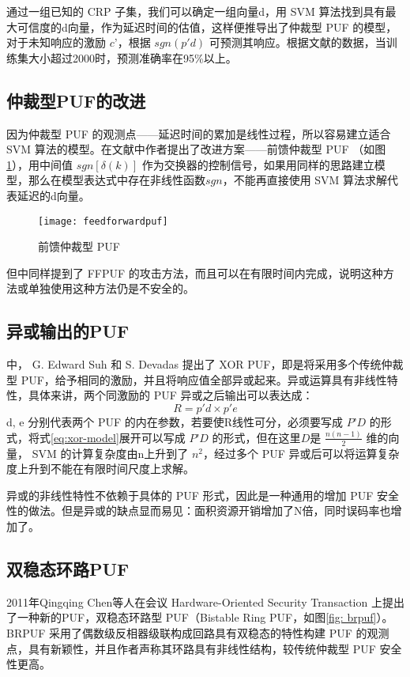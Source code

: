 通过一组已知的 CRP 子集，我们可以确定一组向量d，用 SVM 算法找到具有最大可信度的d向量，作为延迟时间的估值，这样便推导出了仲裁型 PUF 的模型，对于未知响应的激励 $ c’ $，根据 $ sgn(p'd) $ 可预测其响应。根据文献\parencite{lim2005extracting}的数据，当训练集大小超过2000时，预测准确率在95\%以上。

\subsection{仲裁型PUF的改进}
因为仲裁型 PUF 的观测点——延迟时间的累加是线性过程，所以容易建立适合 SVM 算法的模型。在文献\parencite{lim2005extracting}中作者提出了改进方案——前馈仲裁型 PUF （如图\ref{fig: ffpuf}），用中间值 $ sgn[\delta(k)] $ 作为交换器的控制信号，如果用同样的思路建立模型，那么在模型表达式中存在非线性函数$ sgn $，不能再直接使用 SVM 算法求解代表延迟的d向量。

\begin{figure}[htb!]
\centering
\texttt{[image: feedforwardpuf]}
\caption{前馈仲裁型 PUF}
\label{fig: ffpuf}
\end{figure}

但\parencite{lim2005extracting}中同样提到了 FFPUF 的攻击方法，而且可以在有限时间内完成，说明这种方法或单独使用这种方法仍是不安全的。

\subsection{异或输出的PUF}\label{subsec:xormethod}

\parencite{suh2007physical}中， G. Edward Suh 和 S. Devadas 提出了 XOR PUF，即是将采用多个传统仲裁型 PUF，给予相同的激励，并且将响应值全部异或起来。异或运算具有非线性特性，具体来讲，两个同激励的 PUF 异或之后输出可以表达成：
\begin{equation}\label{eq:xor-model}
R=p'd\times p'e
\end{equation}
d, e 分别代表两个 PUF 的内在参数，若要使R线性可分，必须要写成 $ P’D $ 的形式，将式\ref{eq:xor-model}展开可以写成 $ P’D $ 的形式，但在这里$ D $是 $ \frac{n(n-1)}{2} $ 维的向量， SVM 的计算复杂度由n上升到了 $ n^2 $，经过多个 PUF 异或后可以将运算复杂度上升到不能在有限时间尺度上求解。

异或的非线性特性不依赖于具体的 PUF 形式，因此是一种通用的增加 PUF 安全性的做法。但是异或的缺点显而易见：面积资源开销增加了N倍，同时误码率也增加了。

\subsection{双稳态环路PUF}
2011年Qingqing Chen等人在会议 Hardware-Oriented Security Transaction 上提出了一种新的PUF，双稳态环路型 PUF（Bistable Ring PUF，如图\ref{fig: brpuf}）。  BRPUF 采用了偶数级反相器级联构成回路具有双稳态的特性构建 PUF 的观测点，具有新颖性，并且作者声称其环路具有非线性结构，较传统仲裁型 PUF 安全性更高\supercite{chen2011bistable}。

